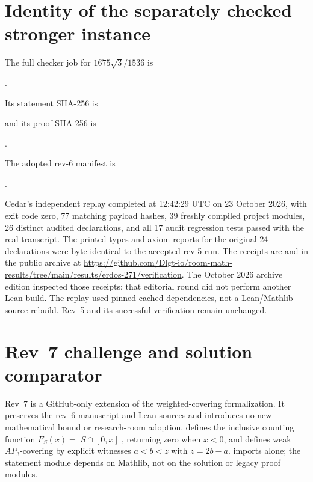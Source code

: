\documentclass[11pt]{article}
\begin{document}
\section{Identity of the separately checked stronger instance}
The full checker job for $1675\sqrt3/1536$ is
\par\noindent{}.\par
Its statement SHA-256 is
\par\noindent{}\par
and its proof SHA-256 is
\par\noindent{}.\par
The adopted rev-6 manifest is
\par\noindent{}.\par
Cedar's independent replay completed at 12:42:29 UTC on 23 October 2026,
with exit code zero, 77 matching payload hashes, 39 freshly compiled project
modules, 26 distinct audited declarations, and all 17 audit regression tests
passed with the real transcript. The printed types and axiom reports for the
original 24 declarations were byte-identical to the accepted rev-5 run.
The receipts are  and
 in the public archive at
\url{https://github.com/Dlgt-io/room-math-results/tree/main/results/erdos-271/verification}.
The October 2026 archive edition
inspected those receipts; that editorial round did not perform another Lean build.
The replay used pinned cached dependencies, not a Lean/Mathlib source rebuild.
Rev~5 and its successful verification remain unchanged.
\section{Rev~7 challenge and solution comparator}\label{sec:rev7-comparator}
Rev~7 is a GitHub-only extension of the weighted-covering formalization. It preserves the rev~6 manuscript and Lean sources and introduces no new mathematical bound or research-room adoption.  defines the inclusive counting function $F_S(x)=|S\cap[0,x]|$, returning zero when $x<0$, and defines weak $AP_3$-covering by explicit witnesses $a<b<z$ with $z=2b-a$.  imports  alone; the statement module depends on Mathlib, not on the solution or legacy proof modules.
\end{document}
